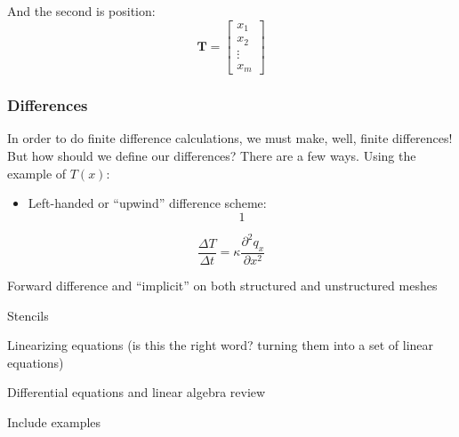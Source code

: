\documentclass[a4paper,10pt]{scrartcl}
\begin{document}
And the second is position:
\begin{equation}
 \boldsymbol{T} =
 \begin{bmatrix}
  x_{1} \\
  x_{2} \\
  \vdots \\
  x_{m}
 \end{bmatrix}
\end{equation}

\subsubsection{Differences}

In order to do finite difference calculations, we must make, well, finite differences! But how should we define our differences? There are a few ways. Using the example of $T(x)$:

\begin{itemize}
 \item Left-handed or ``upwind'' difference scheme:
 \begin{equation}
 1
 \end{equation}
\end{itemize}





\begin{equation}
 \frac{\Delta T}{\Delta t} = \kappa \frac{\partial^2 q_x}{\partial x^2}
\end{equation}



Forward difference and ``implicit''
on both structured and unstructured meshes

Stencils

Linearizing equations (is this the right word? turning them into a set of linear equations)

Differential equations and linear algebra review

Include examples
\end{document}
